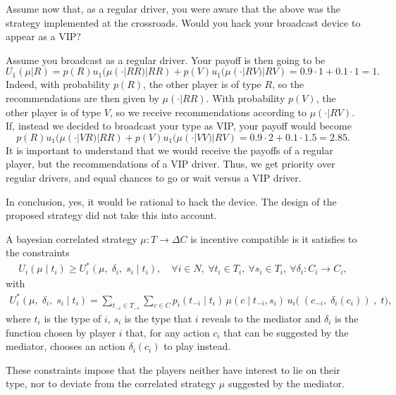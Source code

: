 \begin{example}
Assume now that, as a regular driver, you were aware that the above was the strategy implemented at the crossroads. Would you hack your broadcast device to appear as a VIP?

Assume you broadcast as a regular driver. Your payoff is then going to be 
$$ U_1(\mu | R) =  p(R) u_1(\mu(\cdot | RR) | RR) + p(V)  u_1(\mu(\cdot | RV) | RV) = 0.9 \cdot 1 + 0.1 \cdot 1 = 1. $$
Indeed, with probability $p(R)$, the other player is of type $R$, so the recommendations are then given by $\mu(\cdot | RR)$. With probability $p(V)$, the other player is of type $V$, so we receive recommendations according to $\mu(\cdot | RV)$.
If, instead we decided to broadcast your type as VIP, your payoff would become
$$ p(R) u_1(\mu(\cdot | VR) | RR) + p(V)  u_1(\mu(\cdot | VV) | RV) = 0.9 \cdot 2 + 0.1 \cdot 1.5 = 2.85. $$
It is important to understand that we would receive the payoffs of a regular player, but the recommendations of a VIP driver. Thus, we get priority over regular drivers, and equal chances to go or wait versus a VIP driver.


In conclusion, yes, it would be rational to hack the device. The design of the proposed strategy did not take this into account.
\end{example}


\begin{definition}
A bayesian correlated strategy $\mu : T \rightarrow \Delta C$ is incentive compatible is it satisfies to the constraints
\begin{align*}
	U_i(\mu \; | \; t_i) \geq U_i^*(\mu, \; \delta_i, \; s_i \; | \; t_i), \quad \forall i \in N, \ \forall t_i \in T_i, \ \forall s_i \in T_i, \ \forall \delta_i : C_i \rightarrow C_i,
\end{align*}
with 
\begin{align*}
	U_i^*(\mu, \; \delta_i, \; s_i \; | \; t_i) = \sum_{t_{-i} \in T_{-i}} \sum_{c \in C} p_i(t_{-i} \; | \; t_i) \, \mu(c \; | \; t_{-i}, s_i) \, u_i\big( \; (c_{-i}, \; \delta_i(c_i)) \;, \; t \big),
\end{align*}
where $t_i$ is the type of $i$, $s_i$ is the type that $i$ reveals to the mediator and $\delta_i$ is the function chosen by player $i$ that, for any action $c_i$ that can be suggested by the mediator, chooses an action $\delta_i(c_i)$ to play instead. 
\end{definition}

These constraints impose that the players neither have interest to lie on their type, nor to deviate from the correlated strategy $\mu$ suggested by the mediator. 


